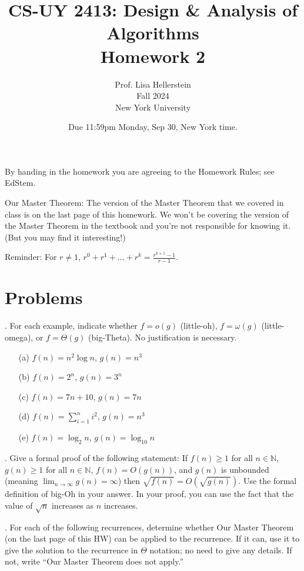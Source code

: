 \documentclass{article}
\title{CS-UY 2413: Design \& Analysis of Algorithms \\ Homework 2}
\author{Prof. Lisa Hellerstein \\ Fall 2024 \\ New York University}
\date{Due 11:59pm Monday, Sep 30, New York time.}
\begin{document}
\maketitle

\vspace{0.5cm}

By handing in the homework you are agreeing to the Homework Rules; see EdStem.

Our Master Theorem: The version of the Master Theorem that we covered in class is on the last page of this homework. We won’t be covering the version of the Master Theorem in the textbook and you’re not responsible for knowing it. (But you may find it interesting!)

Reminder: For $r \neq 1$, $r^0 + r^1 + \dots + r^k = \frac{r^{k+1}-1}{r-1}$.

\section*{Problems}

. For each example, indicate whether $f = o(g)$ (little-oh), $f = \omega(g)$ (little-omega), or $f = \Theta(g)$ (big-Theta). No justification is necessary.

\begin{enumerate}
    \item[(a)] $f(n) = n^2 \log n$, $g(n) = n^3$
    \item[(b)] $f(n) = 2^n$, $g(n) = 3^n$
    \item[(c)] $f(n) = 7n + 10$, $g(n) = 7n$
    \item[(d)] $f(n) = \sum_{i=1}^n i^2$, $g(n) = n^3$
    \item[(e)] $f(n) = \log_2 n$, $g(n) = \log_{10} n$
\end{enumerate}

. Give a formal proof of the following statement: If $f(n) \ge 1$ for all $n \in \mathbb{N}$, $g(n) \ge 1$ for all $n \in \mathbb{N}$, $f(n) = O(g(n))$, and $g(n)$ is unbounded (meaning $\lim_{n\to\infty} g(n) = \infty$) then $\sqrt{f(n)} = O(\sqrt{g(n)})$. Use the formal definition of big-Oh in your answer.  In your proof, you can use the fact that the value of $\sqrt{n}$ increases as $n$ increases.

. For each of the following recurrences, determine whether Our Master Theorem (on the last page of this HW) can be applied to the recurrence. If it can, use it to give the solution to the recurrence in $\Theta$ notation; no need to give any details. If not, write “Our Master Theorem does not apply.”
\end{document}
